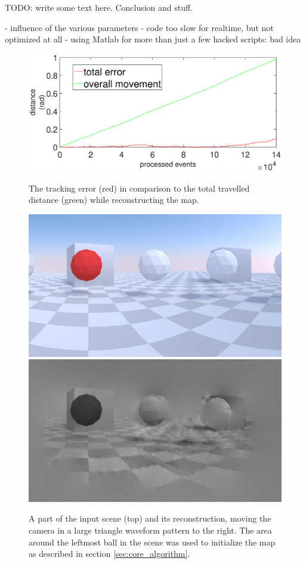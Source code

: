 TODO: write some text here. Conclusion and stuff.

- influence of the various parameters
- code too slow for realtime, but not optimized at all
- using Matlab for more than just a few hacked scripts: bad idea

\begin{figure}
\includegraphics[width=\linewidth]{images/Tracking_error_during_reconstruction.eps}
\label{fig:tracking_error_reconstruction}
\caption{The tracking error (red) in comparison to the total travelled distance (green)
while reconstructing the map.
}
\end{figure}

\begin{figure}
\includegraphics[width=\columnwidth]{images/zigzag_input.png}
\includegraphics[width=\columnwidth]{images/zigzag_reconstruction.png}
\caption{A part of the input scene (top) and its reconstruction,
moving the camera in a large triangle waveform pattern to the right.
The area around the leftmost ball in the scene was used to initialize
the map as described in section \ref{sec:core_algorithm}.}
\label{fig:zigzag_reconstruction}
\end{figure}

